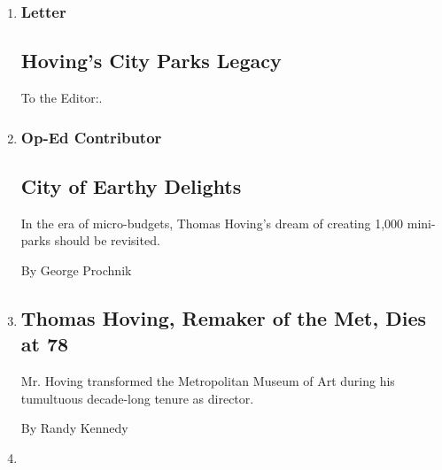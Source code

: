 \begin{enumerate}
\def\labelenumi{\arabic{enumi}.}
\item
  \href{/2009/12/25/opinion/lweb25hoving.html}{}

  \hypertarget{letter}{%
  \subsubsection{Letter}\label{letter}}

  \hypertarget{hovings-city-parks-legacy}{%
  \subsection{Hoving's City Parks
  Legacy}\label{hovings-city-parks-legacy}}

  To the Editor:.
\item
  \href{/2009/12/13/opinion/13prochnik.html}{}

  \hypertarget{op-ed-contributor}{%
  \subsubsection{Op-Ed Contributor}\label{op-ed-contributor}}

  \hypertarget{city-of-earthy-delights}{%
  \subsection{City of Earthy Delights}\label{city-of-earthy-delights}}

  In the era of micro-budgets, Thomas Hoving's dream of creating 1,000
  mini-parks should be revisited.

  By George Prochnik
\item
  \href{/2009/12/11/arts/design/11hoving.html}{}

  \hypertarget{thomas-hoving-remaker-of-the-met-dies-at-78}{%
  \subsection{Thomas Hoving, Remaker of the Met, Dies at
  78}\label{thomas-hoving-remaker-of-the-met-dies-at-78}}

  Mr. Hoving transformed the Metropolitan Museum of Art during his
  tumultuous decade-long tenure as director.

  By Randy Kennedy
\item
  \href{/2007/05/07/opinion/l07stable.html}{}

  \hypertarget{relocate-the-stables-1-letter}{%
}
\end{enumerate}
